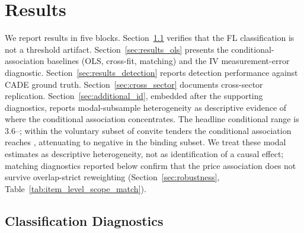 
\section{Results}
\label{sec:results}

We report results in five blocks. Section~\ref{sec:class_diagnostics}
verifies that the FL classification is not a threshold artifact.
Section~\ref{sec:results_ols} presents the conditional-association
baselines (OLS, cross-fit, matching) and the IV measurement-error
diagnostic. Section~\ref{sec:results_detection} reports detection
performance against CADE ground truth. Section~\ref{sec:cross_sector}
documents cross-sector replication. Section~\ref{sec:additional_id},
embedded after the supporting diagnostics, reports modal-subsample
heterogeneity as descriptive evidence of where the conditional
association concentrates. The headline conditional range is
3.6--\valFLpremBottomReg; within the voluntary subset of convite
tenders the conditional association reaches \valWelfareConclLow,
attenuating to negative in the binding subset. We treat these
modal estimates as descriptive heterogeneity, not as
identification of a causal effect; matching diagnostics
reported below confirm that the price association does not
survive overlap-strict reweighting (Section~\ref{sec:robustness},
Table~\ref{tab:item_level_scope_match}).


\subsection{Classification Diagnostics}
\label{sec:class_diagnostics}

